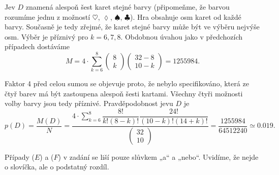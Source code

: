 \begin{example}
    Jev \(D\) znamená alespoň šest karet stejné barvy (připomeňme, že barvou rozumíme jednu z 
    možností \(\heartsuit\), \(\lozenge\), \(\spadesuit\), \(\clubsuit\)). Hra obsahuje osm karet 
    od každé barvy. Současně je tedy zřejmé, že karet stejné barvy může být ve výběru nejvýše osm. 
    Výběr je příznivý pro \(k = 6, 7, 8\). Obdobnou úvahou jako v předchozích případech dostáváme
    \begin{equation*}
      M = 4\cdot\sum^{8}_{k=6}
          \begin{pmatrix} 8 \\ k \end{pmatrix}\begin{pmatrix} 32 - 8 \\ 10 - k\end{pmatrix}
        = \num{1255984}.
    \end{equation*}
    
    Faktor \num{4} před celou sumou se objevuje proto, že nebylo specifikováno, která ze čtyř barev 
    má být zastoupena alespoň šesti kartami. Všechny čtyři možnosti volby barvy jsou tedy příznivé. 
    Pravděpodobnost jevu \(D\) je
    \begin{equation*}
      p(D)  = \dfrac{M(D)}{N}
            = \dfrac{4\cdot\sum^{8}_{k=6}\dfrac{8!}{k!(8-k)!}\dfrac{24!}{(10-k)!(14+k)!}}
                    {\begin{pmatrix} 32 \\ 10 \end{pmatrix}}
            = \dfrac{\num{1255984}}{\num{64512240}} \simeq \num{0.019}.
    \end{equation*}
    
    Případy (\(E\)) a (\(F\)) v zadání se liší pouze slůvkem „a“ a „nebo“. Uvidíme, že nejde o 
    slovíčka, ale o podstatný rozdíl. 
    

\end{example}

